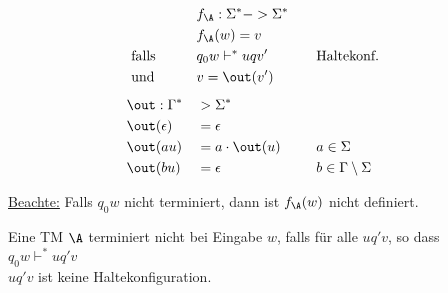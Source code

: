 \begin{Def} %
	\begin{alignat*}{3}
		&&&f_\A:\Sigma^*- \->\Sigma^*\\
		&&&f_\A(w)=v\\
		&\text{ falls } &&q_0w \vdash^*uqv'&\quad&\text{Haltekonf.}\\
		&\text{ und } &&v=\out( v')\\[.5em]
		&\out:\Gamma^* &&\-> \Sigma^*\\
		&\out(\epsilon) &&= \epsilon\\
		&\out(au) &&= a\cdot\out(u) &\quad& a\in\Sigma\\
		&\out(bu) &&= \epsilon && b\in\Gamma\setminus\Sigma
	\end{alignat*}
\end{Def}
\underline{Beachte:} Falls $q_0 w$ nicht terminiert, dann ist $f_\A(w)$ nicht definiert.

Eine \ac{TM} $\A$ terminiert nicht bei Eingabe $w$, falls für alle $uq'v$, so dass $q_0w\vdash^*uq'v$\\
$uq'v$ ist keine Haltekonfiguration.

